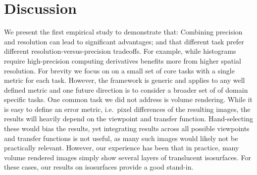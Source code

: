 \section{Discussion}

We present the first empirical study to demonstrate that: Combining precision and resolution can
lead to significant advantages; and that different task prefer different resolution-versus-precision
tradeoffs. For example, while histograms require high-precision computing derivatives benefits more
from higher spatial resolution. For brevity we focus on on a small set of core tasks with a single
metric for each task. However, the framework is generic and applies to any well defined metric and
one future direction is to consider a broader set of of domain specific tasks. One common task we
did not address is volume rendering. While it is easy to define an error metric, i.e.\ pixel
differences of the resulting images, the results will heavily depend on the viewpoint and transfer
function. Hand-selecting these would bias the results, yet integrating results across all possible
viewpoints and transfer functions is not useful, as many such images would likely not be practically
relevant. However, our experience has been that in practice, many volume rendered images simply show
several layers of translucent isosurfaces. For these cases, our results on isosurfaces provide a
good stand-in.


